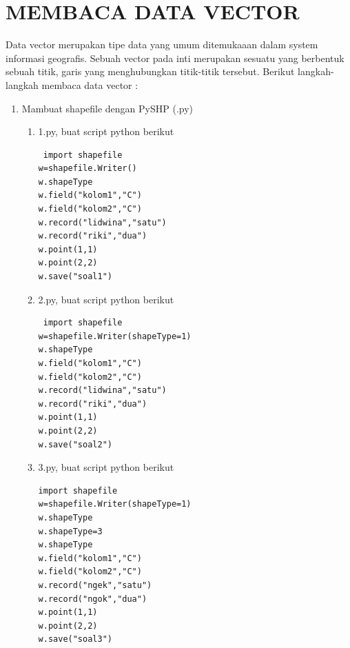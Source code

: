 \section{MEMBACA DATA VECTOR}
Data vector merupakan tipe data yang umum ditemukaaan dalam system informasi geografis. Sebuah vector pada inti merupakan sesuatu yang berbentuk sebuah titik, garis yang menghubungkan titik-titik tersebut.
Berikut langkah-langkah membaca data vector :
\begin{enumerate}
\item Mambuat shapefile dengan PySHP (.py)
\begin{enumerate}
\item 1.py, buat script python berikut
\begin{lstlisting}
 import shapefile         
w=shapefile.Writer()
w.shapeType                 	
w.field("kolom1","C")
w.field("kolom2","C")
w.record("lidwina","satu")
w.record("riki","dua")
w.point(1,1)                  	  
w.point(2,2)
w.save("soal1")
\end{lstlisting}

\item 2.py, buat script python berikut
\begin{lstlisting}
 import shapefile                                               	
w=shapefile.Writer(shapeType=1)       	 
w.shapeType                                                                             	
w.field("kolom1","C")                                      	
w.field("kolom2","C")                                      	
w.record("lidwina","satu")                               	
w.record("riki","dua")                          	
w.point(1,1)                                          	
w.point(2,2)
w.save("soal2")
\end{lstlisting}

\item 3.py, buat script python berikut 
\begin{lstlisting}
import shapefile
w=shapefile.Writer(shapeType=1)
w.shapeType
w.shapeType=3
w.shapeType
w.field("kolom1","C")
w.field("kolom2","C")
w.record("ngek","satu")
w.record("ngok","dua")
w.point(1,1)
w.point(2,2)
w.save("soal3")
\end{lstlisting}
\end{enumerate}
\end{enumerate}